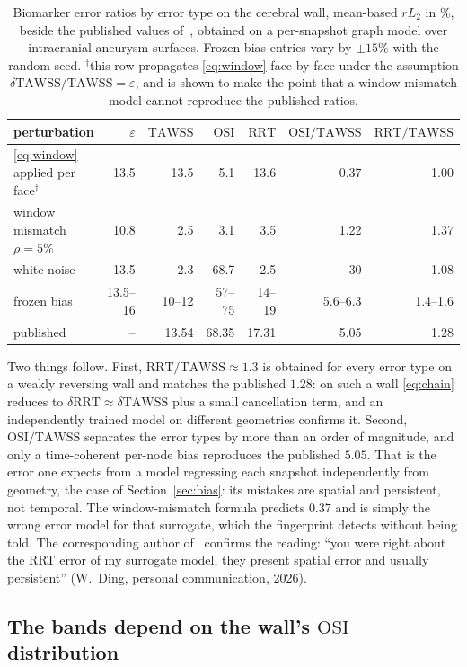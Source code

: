\documentclass[11pt,a4paper]{article}
\newcommand{\TAWSS}{\mathrm{TAWSS}}
\newcommand{\OSI}{\mathrm{OSI}}
\newcommand{\RRT}{\mathrm{RRT}}
\newcommand{\eps}{\varepsilon}
\begin{document}
\begin{table}[t]
\centering
\caption{Biomarker error ratios by error type on the cerebral wall,
mean-based $rL_2$ in \%, beside the published values of~\cite{rhsia2026},
obtained on a per-snapshot graph model over intracranial aneurysm surfaces.
Frozen-bias entries vary by $\pm15\%$ with the random seed.
$^{\dagger}$this row propagates \eqref{eq:window} face by face under the
assumption $\delta\TAWSS/\TAWSS=\eps$, and is shown to make the point that a
window-mismatch model cannot reproduce the published ratios.}
\label{tab:fp}
\begin{tabular}{l r r r r r r}
\toprule
perturbation & $\eps$ & $\TAWSS$ & $\OSI$ & $\RRT$ & $\OSI/\TAWSS$ & $\RRT/\TAWSS$\\
\midrule
\eqref{eq:window} applied per face$^{\dagger}$ & 13.5 & 13.5 & 5.1 & 13.6 & 0.37 & 1.00\\
window mismatch $\rho=5\%$ & 10.8 & 2.5 & 3.1 & 3.5 & 1.22 & 1.37\\
white noise & 13.5 & 2.3 & 68.7 & 2.5 & 30 & 1.08\\
frozen bias & 13.5--16 & 10--12 & 57--75 & 14--19 & 5.6--6.3 & 1.4--1.6\\
\midrule
published~\cite{rhsia2026} & -- & 13.54 & 68.35 & 17.31 & 5.05 & 1.28\\
\bottomrule
\end{tabular}
\end{table}

Two things follow. First, $\RRT/\TAWSS\approx1.3$ is obtained for every error
type on a weakly reversing wall and matches the published $1.28$: on such a
wall \eqref{eq:chain} reduces to $\delta\RRT\approx\delta\TAWSS$ plus a small
cancellation term, and an independently trained model on different geometries
confirms it. Second, $\OSI/\TAWSS$ separates the error types by more than an
order of magnitude, and only a time-coherent per-node bias reproduces the
published $5.05$. That is the error one expects from a model regressing each
snapshot independently from geometry, the case of Section~\ref{sec:bias}: its
mistakes are spatial and persistent, not temporal. The window-mismatch
formula predicts $0.37$ and is simply the wrong error model for that
surrogate, which the fingerprint detects without being told. The
corresponding author of~\cite{rhsia2026} confirms the reading: ``you were
right about the RRT error of my surrogate model, they present spatial error
and usually persistent'' (W.~Ding, personal communication, 2026).

\subsection{The bands depend on the wall's $\OSI$ distribution}
\label{sec:bands}
\end{document}
